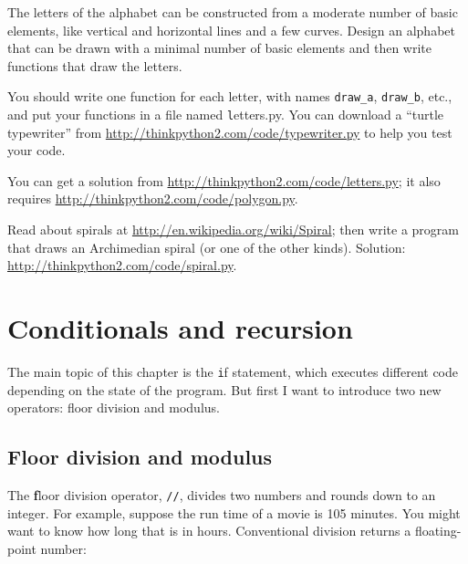 \documentclass[
DIV=11,
fontsize=12,
twoside,
headinclude=false,
titlepage=firstiscover,
abstract=true,
headsepline=true,
footsepline=true,
chapterprefix=true, %
headings=big,
bibliography=totoc,%
captions=tableheading
]{scrbook}
\theoremstyle{definition}
\begin{document}
\begin{exercise}
\normalfont
{}

The letters of the alphabet can be constructed from a moderate number
of basic elements, like vertical and horizontal lines and a few
curves.  Design an alphabet that can be drawn with a minimal
number of basic elements and then write functions that draw the letters.

You should write one function for each letter, with names
\verb"draw_a", \verb"draw_b", etc., and put your functions
in a file named {\texttt letters.py}.  You can download a
``turtle typewriter'' from \url{http://thinkpython2.com/code/typewriter.py}
to help you test your code.

You can get a solution from \url{http://thinkpython2.com/code/letters.py};
it also requires
\url{http://thinkpython2.com/code/polygon.py}.

\end{exercise}

\begin{exercise}
\normalfont

Read about spirals at \url{http://en.wikipedia.org/wiki/Spiral}; then
write a program that draws an Archimedian spiral (or one of the other
kinds).  Solution: \url{http://thinkpython2.com/code/spiral.py}.

\end{exercise}


\chapter{Conditionals and recursion}

The main topic of this chapter is the {\texttt if} statement, which
executes different code depending on the state of the program.
But first I want to introduce two new operators: floor division
and modulus.


\section{Floor division and modulus}

The {\textbf floor division} operator, \verb"//", divides
two numbers and rounds down to an integer.  For example, suppose the
run time of a movie is 105 minutes.  You might want to know how
long that is in hours.  Conventional division
returns a floating-point number:
\end{document}
